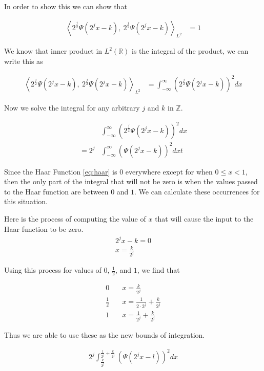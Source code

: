 \documentclass[12pt]{amsart}
\newcommand{\Z}{\mathbb{Z}}
\newcommand{\LP}{L^2(\mathbb{R})}
\begin{document}
In order to show this we can show that

\begin{align}
  {\left<2^\frac{j}{2}\Psi\left(2^jx-k\right),\ 2^\frac{j}{2}\Psi\left(2^jx-k\right)\right>}_{L^2} &= 1
\end{align}

We know that inner product in $\LP$ is the integral of the product, we can write this as


\begin{align}
  {\left<2^\frac{j}{2}\Psi\left(2^jx-k\right),\
  2^\frac{j}{2}\Psi\left(2^jx-k\right)\right>}_{L^2} &=
  \int_{-\infty}^{\infty} {\left(2^\frac{j}{2}\Psi\left(2^jx-k\right)\right)}^2dx
\end{align}

Now we solve the integral for any arbitrary $j$ and $k$ in $\Z$.

\begin{align}
  &\int_{-\infty}^{\infty} {\left(2^\frac{j}{2}\Psi\left(2^jx-k\right)\right)}^2dx\\
  =2^j &\int_{-\infty}^{\infty} {\left(\Psi\left(2^jx-k\right)\right)}^2dx
t\end{align}

Since the Haar Function \eqref{eq:haar} is $0$ everywhere except for when $0\leq
x < 1$, then the only part of the integral that will not be zero is when the
values passed to the Haar function are between $0$ and $1$. We can calculate
these occurrences for this situation.

Here is the process of computing the value of $x$ that will cause the input to
the Haar function to be zero.
\begin{align}
  2^jx-k=0\\
  x=\frac{k}{2^j}
\end{align}

Using this process for values of $0$, $\frac{1}{2}$, and $1$, we find that

\begin{align}
  0\quad&x=\frac{k}{2^j}\\
  \frac{1}{2}\quad&x=\frac{1}{2\cdot2^j}+\frac{k}{2^j}\\
  1\quad&x=\frac{1}{2^j}+\frac{k}{2^j}
\end{align}

Thus we are able to use these as the new bounds of integration.

\begin{align}
  2^j\int_{\frac{k}{2^j}}^{\frac{1}{2^j}+\frac{k}{2^j}}{\left(\Psi\left(2^jx-l\right)\right)}^2dx
\end{align}
\end{document}
